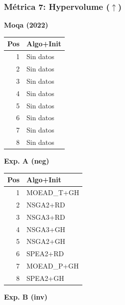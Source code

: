 \documentclass[a4paper,10pt]{article}
\begin{document}
\subsubsection{Métrica 7: Hypervolume \texorpdfstring{($\uparrow$)}{(up)}}
\begin{table}[H]
    \centering
    \begin{minipage}[t]{0.32\textwidth}
        \centering\scriptsize\textbf{Moqa (2022)}\\
        \begin{tabular}{rl}
            \toprule
            Pos & Algo+Init \\ \midrule
            1 & Sin datos \\
            2 & Sin datos \\
            3 & Sin datos \\
            4 & Sin datos \\
            5 & Sin datos \\
            6 & Sin datos \\
            7 & Sin datos \\
            8 & Sin datos \\
            \bottomrule
        \end{tabular}
    \end{minipage}
    \hfill
    \begin{minipage}[t]{0.32\textwidth}
        \centering\scriptsize\textbf{Exp. A (neg)}\\
        \begin{tabular}{rl}
            \toprule
            Pos & Algo+Init \\ \midrule
            1 & MOEAD\_T+GH \\
            2 & NSGA2+RD \\
            3 & NSGA3+RD \\
            4 & NSGA3+GH \\
            5 & NSGA2+GH \\
            6 & SPEA2+RD \\
            7 & MOEAD\_P+GH \\
            8 & SPEA2+GH \\
            \bottomrule
        \end{tabular}
    \end{minipage}
    \hfill
    \begin{minipage}[t]{0.32\textwidth}
        \centering\scriptsize\textbf{Exp. B (inv)}\\
        \begin{tabular}{rl}

\end{tabular}
\end{minipage}
\end{table}
\end{document}
